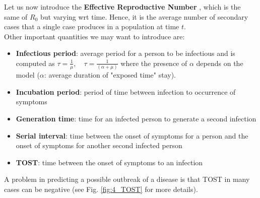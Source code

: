 \documentclass[../main/main.tex]{subfiles}
\begin{document}
Let us now introduce the \textbf{Effective Reproductive Number} , which is the same of $R_0$ but varying wrt time. Hence, it is the average number of secondary cases that a single case produces in a population at time $t$.\\
Other important quantities we may want to introduce are:

\begin{itemize}
    \item \textbf{Infectious period}: average period for a person to be infectious and is computed as $ \tau = \frac{1}{\mu }, \quad \tau = \frac{1}{(\alpha + \mu )} $ where the presence of $\alpha$ depends on the model ($\alpha$: average duration of "exposed time" stay).
    \item \textbf{Incubation period}: period of time between infection to occurrence of symptoms
    \item \textbf{Generation time}: time for an infected person to generate a second infection
    \item \textbf{Serial interval}: time between the onset of symptoms for a person and the onset of symptoms for another second infected person
    \item \textbf{TOST}: time between the onset of symptoms to an infection
    
\end{itemize}
A problem in predicting a possible outbreak of a disease is that TOST in many cases can be negative (see Fig. \ref{fig:4_TOST} for more details).
\end{document}
